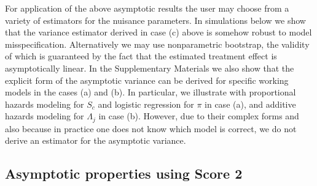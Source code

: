 \documentclass[11pt]{article}
\begin{document}
For application of the above asymptotic results the user may choose from a variety of estimators for the nuisance parameters. 
In simulations below we show  that the variance estimator %
derived in case (c) above 
  is somehow robust to model misspecification. Alternatively we may use nonparametric bootstrap,
the validity of which is guaranteed by the fact that the estimated treatment effect is asymptotically linear.
In the Supplementary Materials %
we also show that the explicit form of the asymptotic variance can be derived for specific working models in the cases (a) and (b). In particular, we illustrate with 
proportional hazards modeling for $S_c$ and logistic regression for $\pi$ in case (a), and 
additive hazards modeling for $\Lambda_j$ in case (b). 
However, 
due to their complex forms and also because in practice one does not know which model is correct,
 we do not derive an estimator for the asymptotic variance. 






\subsection{Asymptotic properties using Score 2}
\end{document}
